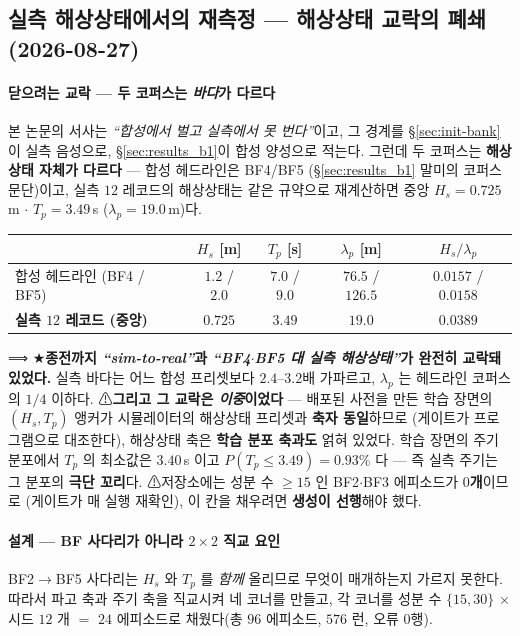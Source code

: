 \documentclass[11pt]{report}
\numberwithin{equation}{chapter}
\numberwithin{figure}{chapter}
\numberwithin{table}{chapter}
\begin{document}
\subsection{실측 해상상태에서의 재측정 --- 해상상태 교락의 폐쇄 (2026-08-27)}
\label{sec:results_b26}

\paragraph{닫으려는 교락 --- 두 코퍼스는 \emph{바다}가 다르다}
본 논문의 서사는 \emph{``합성에서 벌고 실측에서 못 번다''}이고, 그 경계를
\S\ref{sec:init-bank}이 실측 음성으로, \S\ref{sec:results_b1}이 합성 양성으로 적는다.
그런데 두 코퍼스는 \textbf{해상상태 자체가 다르다} --- 합성 헤드라인은 BF4/BF5
(\S\ref{sec:results_b1} 말미의 코퍼스 문단)이고, 실측 $12$ 레코드의 해상상태는
같은 규약으로 재계산하면 중앙 $H_s = 0.725$\,m $\cdot$ $T_p = 3.49$\,s
($\lambda_p = 19.0$\,m)다.

\begin{center}
\begin{tabular}{lcccc}
\toprule
 & $H_s$ [m] & $T_p$ [s] & $\lambda_p$ [m] & $H_s/\lambda_p$ \\
\midrule
합성 헤드라인 (BF4 / BF5) & $1.2$ / $2.0$ & $7.0$ / $9.0$ & $76.5$ / $126.5$ & $0.0157$ / $0.0158$ \\
\textbf{실측 $12$ 레코드 (중앙)} & $\mathbf{0.725}$ & $\mathbf{3.49}$ & $\mathbf{19.0}$ & $\mathbf{0.0389}$ \\
\bottomrule
\end{tabular}
\end{center}

⟹ ★\textbf{종전까지 \emph{``sim-to-real''}과 \emph{``BF4$\cdot$BF5 대 실측 해상상태''}가
완전히 교락돼 있었다.} 실측 바다는 어느 합성 프리셋보다 $2.4$--$3.2$배 가파르고,
$\lambda_p$ 는 헤드라인 코퍼스의 $1/4$ 이하다.
⚠\textbf{그리고 그 교락은 \emph{이중}이었다} --- 배포된 사전을 만든 학습 장면의
$(H_s, T_p)$ 앵커가 시뮬레이터의 해상상태 프리셋과 \textbf{축자 동일}하므로
(게이트가 프로그램으로 대조한다), 해상상태 축은 \textbf{학습 분포 축과도} 얽혀 있었다.
학습 장면의 주기 분포에서 $T_p$ 의 최소값은 $3.40$\,s 이고
$P(T_p \leq 3.49) = 0.93\%$ 다 --- 즉 실측 주기는 그 분포의 \textbf{극단 꼬리}다.
⚠저장소에는 성분 수 $\geq 15$ 인 BF2$\cdot$BF3 에피소드가 \textbf{$0$개}이므로
(게이트가 매 실행 재확인), 이 칸을 채우려면 \textbf{생성이 선행}해야 했다.

\paragraph{설계 --- BF 사다리가 아니라 $2\times2$ 직교 요인}
BF2$\to$BF5 사다리는 $H_s$ 와 $T_p$ 를 \emph{함께} 올리므로 무엇이 매개하는지 가르지
못한다. 따라서 파고 축과 주기 축을 직교시켜 네 코너를 만들고, 각 코너를 성분 수
$\{15, 30\}$ $\times$ 시드 $12$ 개 $=$ $24$ 에피소드로 채웠다(총 $96$ 에피소드,
$576$ 런, 오류 $0$행).
\end{document}
